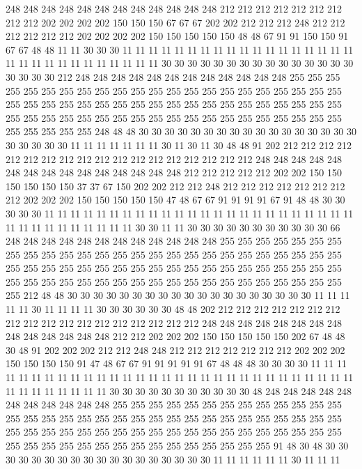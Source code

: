 248 248 248 248 248 248 248 248 248 248 248 248 212 212 212 212 212 212 212 212
212 202 202 202 202 150 150 150 67 67 67 202 202 212 212 212 248 212 212 212
212 212 212 202 202 202 202 150 150 150 150 150 48 48 67 91 91 150 150 91
67 67 48 48 11 11 30 30 30 11 11 11 11 11 11 11 11 11 11 11
11 11 11 11 11 11 11 11 11 11 11 11 11 11 11 11 11 11 11 30
30 30 30 30 30 30 30 30 30 30 30 30 30 30 30 30 30 30 212 248
248 248 248 248 248 248 248 248 248 248 248 255 255 255 255 255 255 255 255 255
255 255 255 255 255 255 255 255 255 255 255 255 255 255 255 255 255 255 255 255
255 255 255 255 255 255 255 255 255 255 255 255 255 255 255 255 255 255 255 255
255 255 255 255 255 255 255 255 255 255 255 255 255 255 255 255 248 48 48 30
30 30 30 30 30 30 30 30 30 30 30 30 30 30 30 30 30 30 30 30
30 11 11 11 11 11 11 11 30 11 30 11 30 48 48 91 202 212 212 212
212 212 212 212 212 212 212 212 212 212 212 212 212 212 212 248 248 248 248 248
248 248 248 248 248 248 248 248 248 248 212 212 212 212 212 202 202 150 150 150
150 150 150 37 37 67 150 202 202 212 212 248 212 212 212 212 212 212 212 212
202 202 202 150 150 150 150 150 47 48 67 67 91 91 91 91 67 91 48 48
30 30 30 30 30 11 11 11 11 11 11 11 11 11 11 11 11 11 11 11
11 11 11 11 11 11 11 11 11 11 11 11 11 11 11 11 11 11 11 30
30 11 11 30 30 30 30 30 30 30 30 30 30 30 66 248 248 248 248 248
248 248 248 248 248 248 248 255 255 255 255 255 255 255 255 255 255 255 255 255
255 255 255 255 255 255 255 255 255 255 255 255 255 255 255 255 255 255 255 255
255 255 255 255 255 255 255 255 255 255 255 255 255 255 255 255 255 255 255 255
255 255 255 255 255 255 255 255 255 255 255 255 212 48 48 30 30 30 30 30
30 30 30 30 30 30 30 30 30 30 30 30 30 30 11 11 11 11 11 30
11 11 11 11 30 30 30 30 30 30 48 48 202 212 212 212 212 212 212 212
212 212 212 212 212 212 212 212 212 212 212 248 248 248 248 248 248 248 248 248
248 248 248 248 248 212 212 202 202 202 150 150 150 150 150 202 67 48 48 30
48 91 202 202 202 212 212 248 248 212 212 212 212 212 212 212 202 202 202 150
150 150 150 91 47 48 67 67 91 91 91 91 91 67 48 48 48 30 30 30
30 11 11 11 11 11 11 11 11 11 11 11 11 11 11 11 11 11 11 11
11 11 11 11 11 11 11 11 11 11 11 11 11 11 11 11 11 11 11 30
30 30 30 30 30 30 30 30 30 30 48 248 248 248 248 248 248 248 248 248
248 248 255 255 255 255 255 255 255 255 255 255 255 255 255 255 255 255 255 255
255 255 255 255 255 255 255 255 255 255 255 255 255 255 255 255 255 255 255 255
255 255 255 255 255 255 255 255 255 255 255 255 255 255 255 255 255 255 255 255
255 255 255 255 255 255 255 255 91 48 30 48 30 30 30 30 30 30 30 30
30 30 30 30 30 30 30 30 30 30 11 11 11 11 11 11 30 11 11 11
